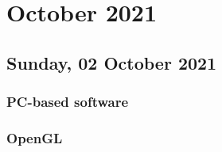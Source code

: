 \chapter[2021 October]{October 2021}

\section[2021/10/02]{Sunday, 02 October 2021}

\subsection{PC-based software}


\subsection{OpenGL}



\pendsign
